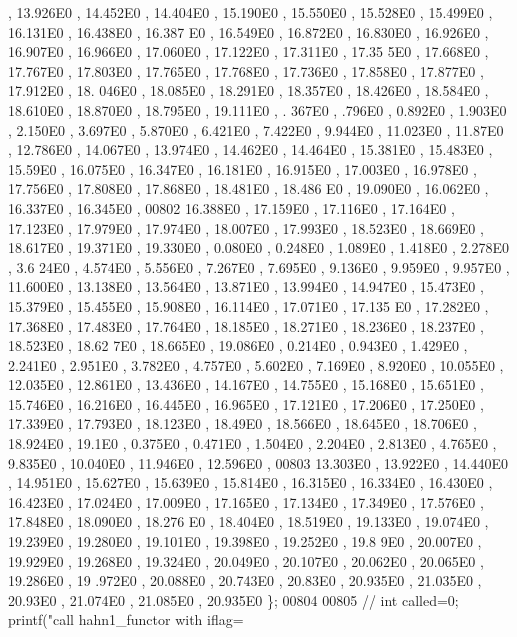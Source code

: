 \begin{DoxyCode}
      , 13.926E0 , 14.452E0 , 14.404E0 , 15.190E0 , 15.550E0 , 15.528E0 , 15.499E0 , 16.131E0 , 16.438E0 , 16.387
      E0 , 16.549E0 , 16.872E0 , 16.830E0 , 16.926E0 , 16.907E0 , 16.966E0 , 17.060E0 , 17.122E0 , 17.311E0 , 17.35
      5E0 , 17.668E0 , 17.767E0 , 17.803E0 , 17.765E0 , 17.768E0 , 17.736E0 , 17.858E0 , 17.877E0 , 17.912E0 , 18.
      046E0 , 18.085E0 , 18.291E0 , 18.357E0 , 18.426E0 , 18.584E0 , 18.610E0 , 18.870E0 , 18.795E0 , 19.111E0 , .
      367E0 , .796E0 , 0.892E0 , 1.903E0 , 2.150E0 , 3.697E0 , 5.870E0 , 6.421E0 , 7.422E0 , 9.944E0 , 11.023E0 , 
      11.87E0  , 12.786E0 , 14.067E0 , 13.974E0 , 14.462E0 , 14.464E0 , 15.381E0 , 15.483E0 , 15.59E0  , 16.075E0 
      , 16.347E0 , 16.181E0 , 16.915E0 , 17.003E0 , 16.978E0 , 17.756E0 , 17.808E0 , 17.868E0 , 18.481E0 , 18.486
      E0 , 19.090E0 , 16.062E0 , 16.337E0 , 16.345E0 ,
00802         16.388E0 , 17.159E0 , 17.116E0 , 17.164E0 , 17.123E0 , 17.979E0 , 17.974E0 , 18.007E0 , 17.993E0 , 
      18.523E0 , 18.669E0 , 18.617E0 , 19.371E0 , 19.330E0 , 0.080E0 , 0.248E0 , 1.089E0 , 1.418E0 , 2.278E0 , 3.6
      24E0 , 4.574E0 , 5.556E0 , 7.267E0 , 7.695E0 , 9.136E0 , 9.959E0 , 9.957E0 , 11.600E0 , 13.138E0 , 13.564E0 
      , 13.871E0 , 13.994E0 , 14.947E0 , 15.473E0 , 15.379E0 , 15.455E0 , 15.908E0 , 16.114E0 , 17.071E0 , 17.135
      E0 , 17.282E0 , 17.368E0 , 17.483E0 , 17.764E0 , 18.185E0 , 18.271E0 , 18.236E0 , 18.237E0 , 18.523E0 , 18.62
      7E0 , 18.665E0 , 19.086E0 , 0.214E0 , 0.943E0 , 1.429E0 , 2.241E0 , 2.951E0 , 3.782E0 , 4.757E0 , 5.602E0 , 
      7.169E0 , 8.920E0 , 10.055E0 , 12.035E0 , 12.861E0 , 13.436E0 , 14.167E0 , 14.755E0 , 15.168E0 , 15.651E0 , 
      15.746E0 , 16.216E0 , 16.445E0 , 16.965E0 , 17.121E0 , 17.206E0 , 17.250E0 , 17.339E0 , 17.793E0 , 18.123E0 
      , 18.49E0  , 18.566E0 , 18.645E0 , 18.706E0 , 18.924E0 , 19.1E0   , 0.375E0 , 0.471E0 , 1.504E0 , 2.204E0 , 
      2.813E0 , 4.765E0 , 9.835E0 , 10.040E0 , 11.946E0 , 12.596E0 , 
00803 13.303E0 , 13.922E0 , 14.440E0 , 14.951E0 , 15.627E0 , 15.639E0 , 15.814E0 , 16.315E0 , 16.334E0 , 16.430E0
       , 16.423E0 , 17.024E0 , 17.009E0 , 17.165E0 , 17.134E0 , 17.349E0 , 17.576E0 , 17.848E0 , 18.090E0 , 18.276
      E0 , 18.404E0 , 18.519E0 , 19.133E0 , 19.074E0 , 19.239E0 , 19.280E0 , 19.101E0 , 19.398E0 , 19.252E0 , 19.8
      9E0  , 20.007E0 , 19.929E0 , 19.268E0 , 19.324E0 , 20.049E0 , 20.107E0 , 20.062E0 , 20.065E0 , 19.286E0 , 19
      .972E0 , 20.088E0 , 20.743E0 , 20.83E0  , 20.935E0 , 21.035E0 , 20.93E0  , 21.074E0 , 21.085E0 , 20.935E0 \};
00804 
00805         \textcolor{comment}{//        int called=0; printf("call hahn1\_functor with  iflag=%
}
\end{DoxyCode}

